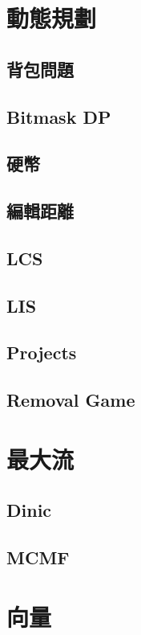 \section{動態規劃}
\subsection{背包問題} 

\subsection{Bitmask DP} 

\subsection{硬幣} 

\subsection{編輯距離} 

\subsection{LCS} 

\subsection{LIS} 

\subsection{Projects} 

\subsection{Removal Game} 


\section{最大流}
\subsection{Dinic} 

\subsection{MCMF} 


\section{向量}
